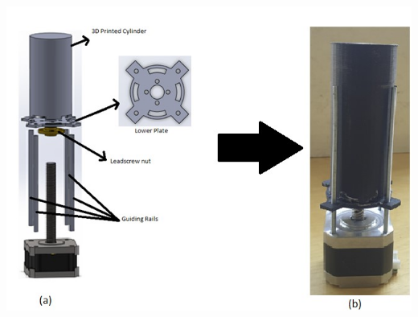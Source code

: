 \documentclass[11pt,landscape]{article}
\newenvironment{Figure}
  {\par\medskip\noindent\minipage{\linewidth}}
  {\endminipage\par\medskip}
\begin{document}
\begin{multicols}{2}
    \begin{Figure}
        \begin{center}
            \includegraphics[width=\textwidth]{Figure21.jpg}
            \label{fig:release1}
        \end{center}
    \end{Figure}
    
    
\end{multicols}
\newpage
\end{document}
